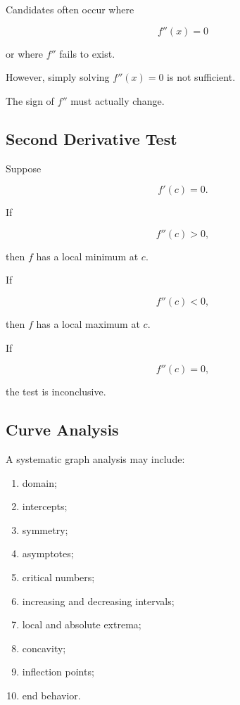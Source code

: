 Candidates often occur where

\[ f''(x)=0 \]

or where \(f''\) fails to exist.

However, simply solving \(f''(x)=0\) is not sufficient.

The sign of \(f''\) must actually change.

\subsection{Second Derivative Test}
\label{subsec:second-derivative-test}

Suppose

\[ f'(c)=0. \]

If

\[ f''(c)>0, \]

then \(f\) has a local minimum at \(c\).

If

\[ f''(c)<0, \]

then \(f\) has a local maximum at \(c\).

If

\[ f''(c)=0, \]

the test is inconclusive.

\subsection{Curve Analysis}
\label{subsec:curve-analysis-calculus}

A systematic graph analysis may include:

\begin{enumerate}
    \item domain;
    \item intercepts;
    \item symmetry;
    \item asymptotes;
    \item critical numbers;
    \item increasing and decreasing intervals;
    \item local and absolute extrema;
    \item concavity;
    \item inflection points;
    \item end behavior.
\end{enumerate}

